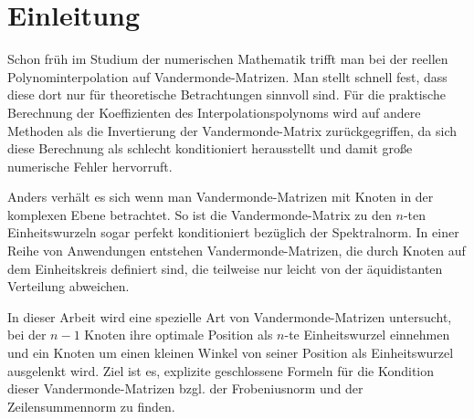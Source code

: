 \chapter{Einleitung}

Schon früh im Studium der numerischen Mathematik trifft man bei der
reellen Polynominterpolation auf Vandermonde-Matrizen.
Man stellt schnell fest, dass diese dort nur für theoretische Betrachtungen
sinnvoll sind.
Für die praktische Berechnung der Koeffizienten des Interpolationspolynoms
wird auf andere Methoden als die Invertierung der Vandermonde-Matrix
zurückgegriffen, da sich diese Berechnung als schlecht konditioniert herausstellt und damit große numerische Fehler hervorruft.

Anders verhält es sich wenn man Vandermonde-Matrizen mit Knoten in der
komplexen Ebene betrachtet.  So ist die Vandermonde-Matrix zu den $n$-ten
Einheitswurzeln sogar perfekt konditioniert bezüglich der Spektralnorm.
In einer Reihe von Anwendungen entstehen Vandermonde-Matrizen, die durch Knoten
auf dem Einheitskreis definiert sind, die teilweise nur leicht von der
äquidistanten Verteilung abweichen.

In dieser Arbeit wird eine spezielle Art von Vandermonde-Matrizen untersucht,
bei der $n-1$ Knoten ihre optimale Position als $n$-te Einheitswurzel einnehmen
und ein Knoten um einen kleinen Winkel von seiner Position als Einheitswurzel
ausgelenkt wird.
Ziel ist es, explizite geschlossene Formeln für die Kondition dieser
Vandermonde-Matrizen bzgl. der Frobeniusnorm und der Zeilensummennorm zu
finden.

